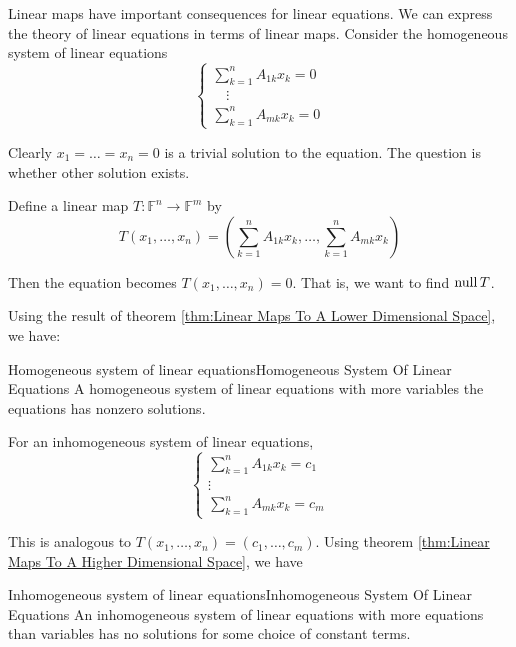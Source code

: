 \documentclass[../main.tex]{subfiles}
\begin{document}
Linear maps have important consequences for linear equations. We can express the theory of linear equations in terms of linear maps. Consider the homogeneous system of linear equations 
\begin{equation}
\begin{cases}
	\displaystyle \sum_{k=1}^{n} A_{1k}x_k=0\\
	\displaystyle \quad \vdots \\
	\displaystyle \sum_{k=1}^{n} A_{mk}x_k=0
\end{cases}
\end{equation}

Clearly $x_1=\ldots =x_n=0$ is a trivial solution to the equation. The question is whether other solution exists.

Define a linear map $T: \mathbb{F}^n \rightarrow \mathbb{F}^m$ by
\begin{equation}
T(x_1, \ldots ,x_n) = \left(\sum_{k=1}^{n} A_{1k}x_k, \ldots ,\sum_{k=1}^{n} A_{mk}x_k\right)
\end{equation}

Then the equation becomes $T(x_1, \ldots ,x_n)=0$. That is, we want to find $\operatorname{null} T$.

Using the result of theorem \ref{thm:Linear Maps To A Lower Dimensional Space}, we have:
\begin{theorem}{Homogeneous system of linear equations}{Homogeneous System Of Linear Equations}
A homogeneous system of linear equations with more variables the equations has nonzero solutions.
\end{theorem}

For an inhomogeneous system of linear equations,
\begin{equation}
\begin{cases}
	\displaystyle \sum_{k=1}^{n} A_{1k}x_k = c_1\\
	\displaystyle \vdots \\
	\displaystyle \sum_{k=1}^{n} A_{mk}x_k = c_m
\end{cases}
\end{equation}

This is analogous to $T(x_1, \ldots ,x_n) = (c_1, \ldots ,c_m)$. Using theorem \ref{thm:Linear Maps To A Higher Dimensional Space}, we have
\begin{theorem}{Inhomogeneous system of linear equations}{Inhomogeneous System Of Linear Equations}
An inhomogeneous system of linear equations with more equations than variables has no solutions for some choice of constant terms.
\end{theorem}
\end{document}
